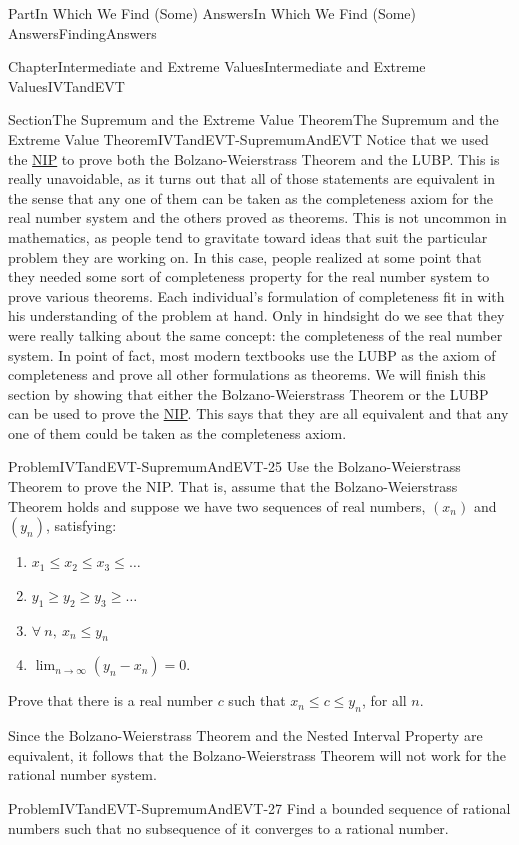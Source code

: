 \documentclass[oneside,10pt,]{book}
\numberwithin{equation}{part}
\begin{document}
\begin{partptx}{Part}{In Which We Find (Some) Answers}{}{In Which We Find (Some) Answers}{}{}{FindingAnswers}
\begin{chapterptx}{Chapter}{Intermediate and Extreme Values}{}{Intermediate and Extreme Values}{}{}{IVTandEVT}
\begin{sectionptx}{Section}{The Supremum and the Extreme Value Theorem}{}{The Supremum and the Extreme Value Theorem}{}{}{IVTandEVT-SupremumAndEVT}
Notice that we used the \hyperref[NIP]{NIP}  to prove both the Bolzano-Weierstrass Theorem and the LUBP. This is really unavoidable, as it turns out that all of those statements are equivalent in the sense that any one of them can be taken as the completeness axiom for the real number system and the others proved as theorems. This is not uncommon in mathematics, as people tend to gravitate toward ideas that suit the particular problem they are working on. In this case, people realized at some point that they needed some sort of completeness property for the real number system to prove various theorems. Each individual's formulation of completeness fit in with his understanding of the problem at hand. Only in hindsight do we see that they were really talking about the same concept: the completeness of the real number system. In point of fact, most modern textbooks use the LUBP as the axiom of completeness and prove all other formulations as theorems. We will finish this section by showing that either the Bolzano-Weierstrass Theorem or the LUBP can be used to prove the \hyperref[NIP]{NIP}. This says that they are all equivalent and that any one of them could be taken as the completeness axiom.%
\begin{problem}{Problem}{}{IVTandEVT-SupremumAndEVT-25}%
 Use the Bolzano-Weierstrass Theorem to prove the NIP. That is, assume that the Bolzano-Weierstrass Theorem holds and suppose we have two sequences of real numbers, \(\left(x_n\right)\) and \(\left(y_n\right)\), satisfying:%
\begin{enumerate}
\item{}\(\displaystyle x_1\le x_2 \le x_3 \le \ldots\)%
\item{}\(\displaystyle y_1\ge y_2 \ge y_3 \ge \ldots\)%
\item{}\(\displaystyle \forall\ n,\ x_n\le y_n\)%
\item{}\(\displaystyle\lim_{n\rightarrow\infty}\left(y_n-x_n\right) = 0\).%
\end{enumerate}
%
\par
Prove that there is a real number \(c\) such that \(x_n\le c\le y_n\), for all \(n\).%
\end{problem}
Since the Bolzano-Weierstrass Theorem and the Nested Interval Property are equivalent, it follows that the Bolzano-Weierstrass Theorem will not work for the rational number system.%
\begin{problem}{Problem}{}{IVTandEVT-SupremumAndEVT-27}%
 Find a bounded sequence of rational numbers such that no subsequence of it converges to a rational number.%

\end{problem}
\end{sectionptx}
\end{chapterptx}
\end{partptx}
\end{document}

